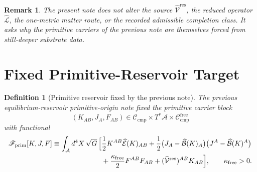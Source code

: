 \documentclass[11pt]{article}
\newcommand{\Sub}{\mathcal A}
\newcommand{\ResidualLift}{\widehat{\mathcal V}^{\mathrm{res}}}
\newcommand{\SubEinLin}{\widehat{\mathcal E}}
\newcommand{\SubGaugeVec}{\widehat{\mathcal B}}
\newcommand{\SubReducedEin}{\widehat{\mathcal L}}
\newcommand{\CompClass}{\mathscr C_{\mathrm{cmp}}}
\newcommand{\CompFree}{\mathscr C_{\mathrm{cmp}}^{\mathrm{free}}}
\newcommand{\PrimFunctional}{\mathscr F_{\mathrm{prim}}}
\newcommand{\FreeStiff}{\kappa_{\mathrm{free}}}
\newcommand{\PrimStrain}{K}
\newcommand{\PrimNeutral}{J}
\newcommand{\PrimFree}{F}
\newtheorem{definition}{Definition}
\newtheorem{remark}{Remark}
\begin{document}
\begin{remark}
The present note does not alter the source \(\ResidualLift\), the reduced operator \(\SubReducedEin\), the one-metric matter route, or the recorded admissible completion class. It asks why the primitive carriers of the previous note are themselves forced from still-deeper substrate data.
\end{remark}

\section{Fixed Primitive-Reservoir Target}

\begin{definition}[Primitive reservoir fixed by the previous note]
\label{def:primitive}
The previous equilibrium-reservoir primitive-origin note fixed the primitive carrier block
\[
(\PrimStrain_{AB},\PrimNeutral_A,\PrimFree_{AB})
\in
\CompClass\times T^*\Sub\times \CompFree
\]
with functional
\begin{equation}
\begin{aligned}
\PrimFunctional[\PrimStrain,\PrimNeutral,\PrimFree]
\equiv
\int_{\Sub} d^4X\,\sqrt{G}\,
\Bigl[
&\frac12 \PrimStrain^{AB}\SubEinLin(\PrimStrain)_{AB}
+\frac12\bigl(\PrimNeutral_A-\SubGaugeVec(\PrimStrain)_A\bigr)
\bigl(\PrimNeutral^A-\SubGaugeVec(\PrimStrain)^A\bigr)
\\
&+\frac{\FreeStiff}{2}\PrimFree^{AB}\PrimFree_{AB}
+(\ResidualLift)^{AB}\PrimStrain_{AB}
\Bigr],
\qquad
\FreeStiff>0.
\end{aligned}
\label{eq:primitive}
\end{equation}
\end{definition}
\end{document}
